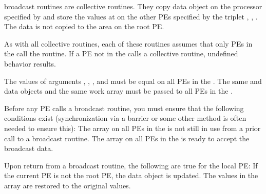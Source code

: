 {   
\openshmem broadcast routines are collective routines.
They copy data object \source{} on the processor specified by  and
store the values at \target{} on the other \ac{PE}s specified by the triplet
, , . The data is not copied to the \target{}
area on the root \ac{PE}.

As with all \openshmem collective routines, each of these routines assumes
that only \ac{PE}s in the \activeset{} call the routine. If a \ac{PE} not in the
\activeset{} calls a \openshmem collective routine, undefined behavior
results.

The values of arguments , , , and 
must be equal on all \ac{PE}s in the \activeset. The same \target{} and \source{}
data objects and the same  work array must be passed to all \ac{PE}s in
the \activeset.

Before any \ac{PE} calls a broadcast	routine, you must ensure that the
following conditions exist (synchronization via a barrier or some other
method is often needed to ensure this): The  array on all \ac{PE}s in
the \activeset{} is not still in use from a prior call to a broadcast
routine. The \target{} array on all \ac{PE}s in the \activeset{} is ready to
accept the broadcast data.

Upon return from a broadcast routine, the following are true for the
local \ac{PE}: If the current \ac{PE} is not the root \ac{PE}, the \target{} data	object
is updated. The values in the  array are restored to the original
values.
}
